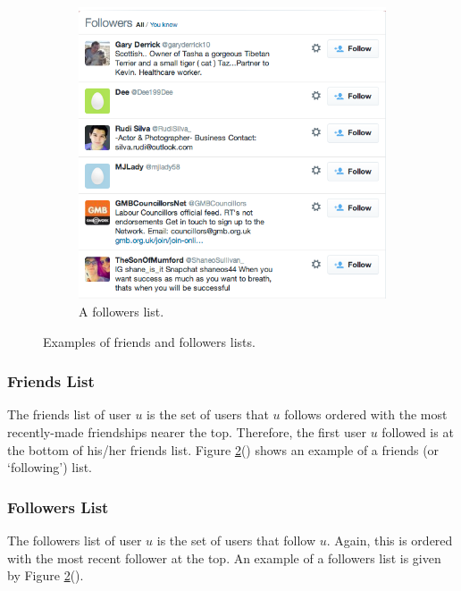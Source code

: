 \begin{figure}[h]
\begin{subfigure}{.5\textwidth}
        \includegraphics[scale=0.4]{2.Background/Media/followers_list.png} 
        \caption{A followers list.}
        \label{fig:followers_list}
    \end{subfigure}
    \caption{Examples of friends and followers lists.}
    \label{fig:following_followers_list}
\end{figure}

\subsubsection{Friends List}
The friends list of user $u$ is the set of users that $u$ follows ordered with the most recently-made friendships nearer the top. Therefore, the first user $u$ followed is at the bottom of his/her friends list. Figure \ref{fig:following_followers_list}() shows an example of a friends (or `following') list.

\subsubsection{Followers List}
The followers list of user $u$ is the set of users that follow $u$. Again, this is ordered with the most recent follower at the top. An example of a followers list is given by Figure \ref{fig:following_followers_list}().


